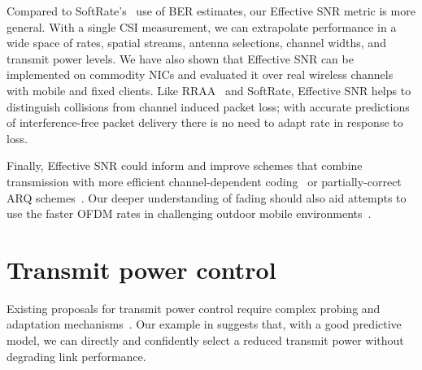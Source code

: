 Compared to SoftRate's~\cite{Vutukuru_SoftRate} use of BER estimates, our Effective SNR metric is more general. With a single CSI measurement, we can extrapolate performance in a wide space of rates, spatial streams, antenna selections, channel widths, and transmit power levels. We have also shown that Effective SNR can be implemented on commodity NICs and evaluated it over real wireless channels with mobile and fixed clients. Like RRAA~\cite{Wong_RRAA} and SoftRate, Effective SNR helps to distinguish collisions from channel induced packet loss; with accurate predictions of interference-free packet delivery there is no need to adapt rate in response to loss.

Finally, Effective SNR could inform and improve schemes that combine transmission with more efficient channel-dependent coding~\cite{Lin_ZipTX} or partially-correct ARQ schemes~\cite{Jamieson_PPR}. Our deeper understanding of fading should also aid attempts to use the faster OFDM rates in challenging outdoor mobile environments~\cite{Eriksson_Cabernet}. %

\section{Transmit power control}
Existing proposals for transmit power control require complex probing and adaptation mechanisms~\cite{Monks_PowerMAC,Ramachandran_Symphony,Son_PowerStudy}. Our %
example in  suggests 
that, with a good predictive model, we can directly and confidently select a reduced transmit power without degrading link performance. 

\ifx\mainfile\undefined

\fi
